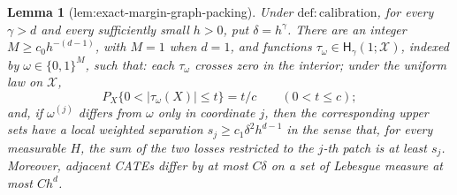 \documentclass{article}
\newtheorem{lemma}{Lemma}
\begin{document}
\begin{lemma}[lem:exact-margin-graph-packing]\label{lem:exact-margin-graph-packing}
Under \(\mathrm{def:calibration}\), for every \(\gamma>d\) and every sufficiently small \(h>0\), put \(\delta=h^\gamma\). There are an integer \(M\ge c_0h^{-(d-1)}\), with \(M=1\) when \(d=1\), and functions \(\tau_\omega\in\mathsf H_\gamma(1;\mathcal X)\), indexed by \(\omega\in\{0,1\}^M\), such that: each \(\tau_\omega\) crosses zero in the interior; under the uniform law on \(\mathcal X\),
\[
 P_X\{0<|\tau_\omega(X)|\le t\}=t/c\qquad(0<t\le c);
\]
and, if \(\omega^{(j)}\) differs from \(\omega\) only in coordinate \(j\), then the corresponding upper sets have a local weighted separation \(s_j\ge c_1\delta^2h^{d-1}\) in the sense that, for every measurable \(H\), the sum of the two losses restricted to the \(j\)-th patch is at least \(s_j\). Moreover, adjacent CATEs differ by at most \(C\delta\) on a set of Lebesgue measure at most \(Ch^d\).
\end{lemma}
\end{document}
